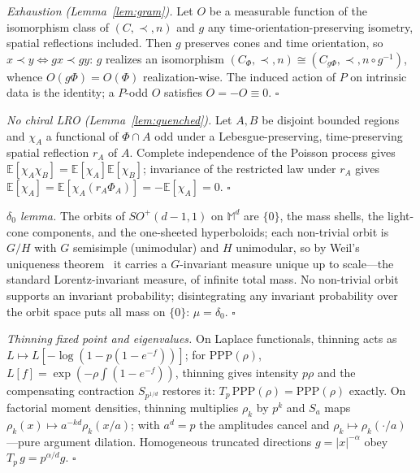 \documentclass[aps,prd,reprint,nofootinbib,superscriptaddress,floatfix]{revtex4-2}
\theoremstyle{definition}
\begin{document}
\emph{Exhaustion (Lemma~\ref{lem:gram}).} Let $O$ be a measurable function of the
isomorphism class of $(C,\prec,n)$ and $g$ any time-orientation-preserving isometry,
spatial reflections included. Then $g$ preserves cones and time orientation, so
$x\prec y\Leftrightarrow gx\prec gy$: $g$ realizes an isomorphism
$(C_\Phi,\prec,n)\cong(C_{g\Phi},\prec,n\circ g^{-1})$, whence $O(g\Phi)=O(\Phi)$
realization-wise. The induced action of $P$ on intrinsic data is the identity; a
$P$-odd $O$ satisfies $O=-O\equiv0$. $\square$

\emph{No chiral LRO (Lemma~\ref{lem:quenched}).} Let $A,B$ be disjoint bounded regions
and $\chi_A$ a functional of $\Phi\cap A$ odd under a Lebesgue-preserving,
time-preserving spatial reflection $r_A$ of $A$. Complete independence of the Poisson
process gives $\mathbb{E}[\chi_A\chi_B]=\mathbb{E}[\chi_A]\mathbb{E}[\chi_B]$;
invariance of the restricted law under $r_A$ gives
$\mathbb{E}[\chi_A]=\mathbb{E}[\chi_A(r_A\Phi_A)]=-\mathbb{E}[\chi_A]=0$. $\square$

\emph{$\delta_0$ lemma.} The orbits of $SO^{+}(d-1,1)$ on $\mathbb{M}^d$ are $\{0\}$,
the mass shells, the light-cone components, and the one-sheeted hyperboloids; each
non-trivial orbit is $G/H$ with $G$ semisimple (unimodular) and $H$ unimodular, so by
Weil's uniqueness theorem~\cite{Folland1995} it carries a $G$-invariant measure unique
up to scale---the standard Lorentz-invariant measure, of infinite total mass. No
non-trivial orbit supports an invariant probability; disintegrating any invariant
probability over the orbit space puts all mass on $\{0\}$: $\mu=\delta_0$. $\square$

\emph{Thinning fixed point and eigenvalues.} On Laplace functionals, thinning acts as
$L\mapsto L[-\log(1-p(1-e^{-f}))]$; for $\mathrm{PPP}(\rho)$,
$L[f]=\exp(-\rho\!\int(1-e^{-f}))$, thinning gives intensity $p\rho$ and the
compensating contraction $S_{p^{1/d}}$ restores it: $T_p\,\mathrm{PPP}(\rho)=
\mathrm{PPP}(\rho)$ exactly. On factorial moment densities, thinning multiplies
$\rho_k$ by $p^k$ and $S_a$ maps $\rho_k(x)\mapsto a^{-kd}\rho_k(x/a)$; with $a^d=p$
the amplitudes cancel and $\rho_k\mapsto\rho_k(\cdot/a)$---pure argument dilation.
Homogeneous truncated directions $g=|x|^{-\alpha}$ obey $T_p\,g=p^{\alpha/d}g$.
$\square$
\end{document}
